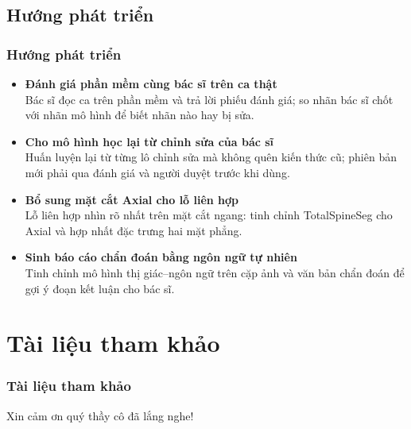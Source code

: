 \documentclass{beamer}
\numberwithin{figure}{section}
\numberwithin{table}{section}
\begin{document}
\subsection{Hướng phát triển}
\begin{frame}
\frametitle{Hướng phát triển}
\begin{itemize}
    \item[1.] \textbf{Đánh giá phần mềm cùng bác sĩ trên ca thật}\\
    {\footnotesize Bác sĩ đọc ca trên phần mềm và trả lời phiếu đánh giá; so nhãn bác sĩ chốt với nhãn mô hình để biết nhãn nào hay bị sửa.}
    \item[2.] \textbf{Cho mô hình học lại từ chỉnh sửa của bác sĩ}\\
    {\footnotesize Huấn luyện lại từ từng lô chỉnh sửa mà không quên kiến thức cũ; phiên bản mới phải qua đánh giá và người duyệt trước khi dùng.}
    \item[3.] \textbf{Bổ sung mặt cắt Axial cho lỗ liên hợp}\\
    {\footnotesize Lỗ liên hợp nhìn rõ nhất trên mặt cắt ngang: tinh chỉnh TotalSpineSeg cho Axial và hợp nhất đặc trưng hai mặt phẳng.}
    \item[4.] \textbf{Sinh báo cáo chẩn đoán bằng ngôn ngữ tự nhiên}\\
    {\footnotesize Tinh chỉnh mô hình thị giác--ngôn ngữ trên cặp ảnh và văn bản chẩn đoán để gợi ý đoạn kết luận cho bác sĩ.}
\end{itemize}
\end{frame}

\section{Tài liệu tham khảo}
\begin{frame}[allowframebreaks]
\frametitle{Tài liệu tham khảo}
\printbibliography
\end{frame}

\begin{frame}
\huge{\centerline{Xin cảm ơn quý thầy cô đã lắng nghe!}}
\end{frame}
\end{document}
